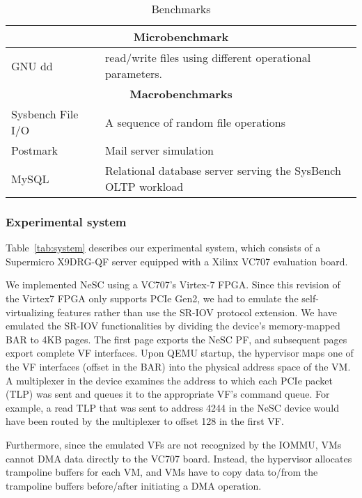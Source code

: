 \begin{table}[t]
  \small
  \begin{tabular}{|p{}|p{}|}
    \hline
    \multicolumn{2}{|c|}{\textbf{Microbenchmark}} \\
    \hline
    GNU dd~\cite{coreutils}	& read/write files using different operational parameters.\\
    \hline
    \hline
    \multicolumn{2}{|c|}{\textbf{Macrobenchmarks}} \\
    \hline
    Sysbench File I/O~\cite{kopytov2004sysbench}
    			& A sequence of random file operations \\
    \hline
    Postmark~\cite{katcher1997postmark}
    			& Mail server simulation \\
    \hline
    MySQL~\cite{mysql}	& Relational database server serving the SysBench OLTP workload  \\
    \hline
    \hline
  \end{tabular}

  \vspace*{1ex}
  \caption{Benchmarks\label{tab:bench}}


\end{table}


\subsubsection*{\bf Experimental system}
Table~\ref{tab:system} describes our experimental system, which consists of a Supermicro X9DRG-QF server equipped with a Xilinx VC707 evaluation board.

We implemented NeSC using a VC707's Virtex-7 FPGA. Since this revision of the Virtex7 FPGA only supports PCIe Gen2, we had to emulate the self-virtualizing features rather than use the SR-IOV protocol extension. We have emulated the SR-IOV functionalities by dividing the device's memory-mapped BAR to 4KB pages. The first page exports the NeSC PF, and subsequent pages export complete VF interfaces. Upon QEMU startup, the hypervisor maps one of the VF interfaces (offset in the BAR) into the physical address space of the VM. A  multiplexer in the device examines the address to which each PCIe packet (TLP) was sent and queues it to the appropriate VF's command queue. For example, a read TLP that was sent to address 4244 in the NeSC device would have been routed by the multiplexer to offset 128 in the first VF.

Furthermore, since the emulated VFs are not recognized by the IOMMU, VMs cannot DMA data directly to the VC707 board. Instead, the hypervisor allocates trampoline buffers for each VM, and VMs have to copy data to/from the trampoline buffers before/after initiating a DMA operation.

